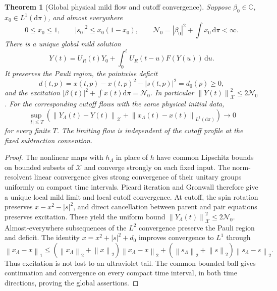 \documentclass[11pt,a4paper,oneside]{book}
\theoremstyle{plain}
\newtheorem{theorem}{Theorem}[chapter]
\theoremstyle{definition}
\theoremstyle{remark}
\newcommand{\C}{\mathbb C}
\newcommand{\dd}{\mathrm d}
\newcommand{\norm}[1]{\left\lVert#1\right\rVert}
\newcommand{\src}[2]{\cite{#1}}
\begin{document}
\begin{theorem}[Global physical mild flow and cutoff convergence]
\label{thm:collective-global-mild}
Suppose $\beta_0\in\C$, $x_0\in L^1(\dd\pi)$, and almost everywhere
\begin{equation}
 0\le x_0\le1,\qquad |s_0|^2\le x_0(1-x_0),\qquad
 \mathcal N_0=|\beta_0|^2+\int x_0\,\dd\pi<\infty.
 \label{eq:collective-physical-data}
\end{equation}
There is a unique global mild solution
\begin{equation}
 Y(t)=U_R(t)Y_0+\int_0^t U_R(t-u)F(Y(u))\,\dd u.
 \label{eq:collective-mild-solution}
\end{equation}
It preserves the Pauli region, the pointwise deficit
\begin{equation}
 d(t,p)=x(t,p)-x(t,p)^2-|s(t,p)|^2=d_0(p)\ge0,
 \label{eq:collective-deficit}
\end{equation}
and the excitation $|\beta(t)|^2+\int x(t)\dd\pi=\mathcal N_0$.
In particular $\norm{Y(t)}_{\mathcal X}^2\le2\mathcal N_0$.
For the corresponding cutoff flows with the same physical initial data,
\begin{equation}
 \sup_{|t|\le T}\left(
 \norm{Y_\Lambda(t)-Y(t)}_{\mathcal X}
       +\norm{x_\Lambda(t)-x(t)}_{L^1(\dd\pi)}\right)\longrightarrow0
 \label{eq:collective-mild-cutoff-limit}
\end{equation}
for every finite $T$.  The limiting flow is independent of the cutoff
profile at the fixed subtraction convention.
\end{theorem}
\begin{proof}
The nonlinear maps with $h_\Lambda$ in place of $h$ have common
Lipschitz bounds on bounded subsets of $\mathcal X$ and converge
strongly on each fixed input.  The norm-resolvent linear convergence
gives strong convergence of their unitary groups uniformly on compact
time intervals.  Picard iteration and Gronwall therefore give a unique
local mild limit and local cutoff convergence.  At cutoff, the spin
rotation preserves $x-x^2-|s|^2$, and direct cancellation between
parent and pair equations preserves excitation.  These yield the
uniform bound $\norm{Y_\Lambda(t)}_{\mathcal X}^2\le2\mathcal N_0$.
Almost-everywhere subsequences of the $L^2$ convergence preserve the
Pauli region and deficit.  The identity
$x=x^2+|s|^2+d_0$ improves convergence to $L^1$ through
\[
 \norm{x_\Lambda-x}_1\le
 (\norm{x_\Lambda}_2+\norm x_2)\norm{x_\Lambda-x}_2
 +(\norm{s_\Lambda}_2+\norm s_2)\norm{s_\Lambda-s}_2.
\]
Thus excitation is not lost to an ultraviolet tail.  The common
bounded ball gives continuation and convergence on every compact time
interval, in both time directions, proving the global assertions.
\end{proof}
\src{R20}{lem:v20v66-local,lem:v20v66-cutoff,thm:v20v66-global}
\end{document}
